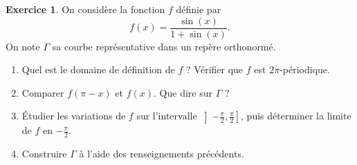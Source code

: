 \documentclass[a4paper, 11pt,openany]{article}%
\theoremstyle{plain}
\theoremstyle{definition}
\newtheorem{exo}{Exercice}
\theoremstyle{remark}
\begin{document}
\begin{exo}
On considère la fonction $f$ définie par \[f(x)=\frac{\sin(x)}{1+\sin(x)}.\]
On note $\Gamma$ sa courbe représentative dans un repère orthonormé.
\begin{enumerate}
\item Quel est le domaine de définition de $f$ ? Vérifier que $f$ est $2\pi$-périodique.
\item Comparer $f(\pi-x)$ et $f(x)$. Que dire sur $\Gamma$ ?
\item Étudier les variations de $f$ sur l'intervalle $\left] - \frac{\pi}{2} , \frac{\pi}{2} \right]$, puis déterminer la limite de $f$ en $-\frac{\pi}{2}$.
\item Construire $\Gamma$ à l'aide des renseignements précédents. 
\end{enumerate}
\end{exo}
%
\end{document}
